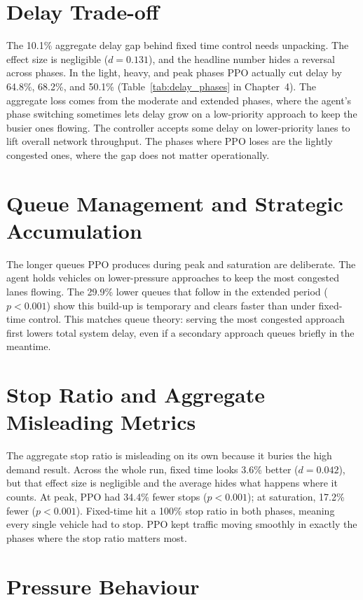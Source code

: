 ﻿\documentclass[11pt, a4paper]{report}
\begin{document}
\section{Delay Trade-off}

The 10.1\% aggregate delay gap behind fixed time control needs unpacking. The effect size is negligible ($d = 0.131$), and the headline number hides a reversal across phases. In the light, heavy, and peak phases PPO actually cut delay by 64.8\%, 68.2\%, and 50.1\% (Table~\ref{tab:delay_phases} in Chapter~4). The aggregate loss comes from the moderate and extended phases, where the agent's phase switching sometimes lets delay grow on a low-priority approach to keep the busier ones flowing. The controller accepts some delay on lower-priority lanes to lift overall network throughput. The phases where PPO loses are the lightly congested ones, where the gap does not matter operationally.

\section{Queue Management and Strategic Accumulation}

The longer queues PPO produces during peak and saturation are deliberate. The agent holds vehicles on lower-pressure approaches to keep the most congested lanes flowing. The 29.9\% lower queues that follow in the extended period ($p < 0.001$) show this build-up is temporary and clears faster than under fixed-time control. This matches queue theory: serving the most congested approach first lowers total system delay, even if a secondary approach queues briefly in the meantime.

\section{Stop Ratio and Aggregate Misleading Metrics}

The aggregate stop ratio is misleading on its own because it buries the high demand result. Across the whole run, fixed time looks 3.6\% better ($d = 0.042$), but that effect size is negligible and the average hides what happens where it counts. At peak, PPO had 34.4\% fewer stops ($p < 0.001$); at saturation, 17.2\% fewer ($p < 0.001$). Fixed-time hit a 100\% stop ratio in both phases, meaning every single vehicle had to stop. PPO kept traffic moving smoothly in exactly the phases where the stop ratio matters most.

\section{Pressure Behaviour}
\end{document}
